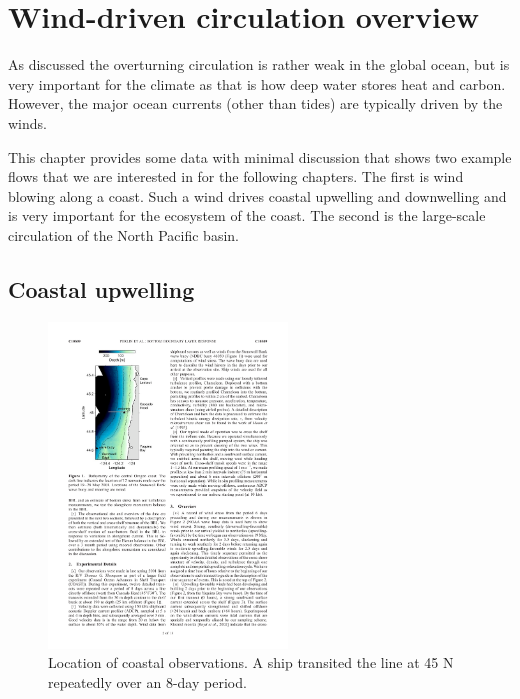 \chapter{Wind-driven circulation overview}
\label{chap:winddriven}

As discussed the overturning circulation is rather weak in the global ocean, but is very important for the climate as that is how deep water stores heat and carbon.  However, the major ocean currents (other than tides) are typically driven by the winds.  

This chapter provides some data with minimal discussion that shows two example flows that we are interested in for the following chapters.  The first is wind blowing along a coast.  Such a wind drives coastal upwelling and downwelling and is very important for the ecosystem of the coast.   The second is the large-scale circulation of the North Pacific basin.  

\section{Coastal upwelling}

\begin{figure}[hbt]
  \begin{center}
  \includegraphics[width=2.5in]{figs/WindOverview/PerlinFig1}
    \caption{Location of coastal observations.  A ship transited the line at 45 N repeatedly over an 8-day period.  }
    \label{fig:PerlinFig1}  
  \end{center}
\end{figure}


